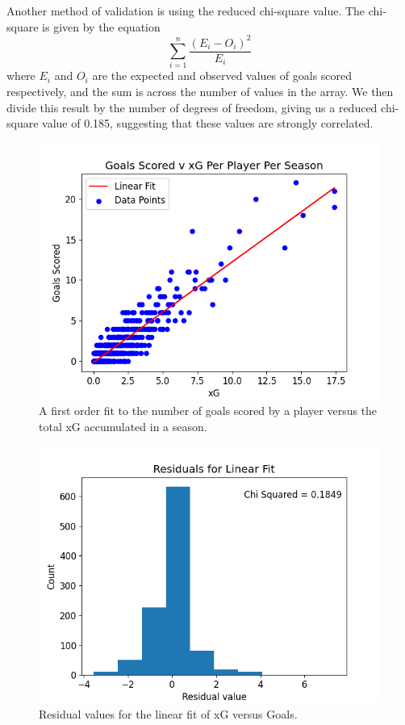 \documentclass[12pt, a4paper, twocolumn]{article}
\begin{document}
Another method of validation is using the reduced chi-square value. The chi-square is given by the equation
\begin{equation}
\sum_{i=1}^n \frac{(E_i - O_i)^2}{E_i} 
\end{equation}
where $E_i$ and $O_i$ are the expected and observed values of goals scored respectively, and the sum is across the number of values in the array. We then divide this result by the number of degrees of freedom, giving us a reduced chi-square value of 0.185, suggesting that these values are strongly correlated.

\begin{figure}
  \includegraphics[width=\linewidth]{../vis/playerStats/goals_v_xg_linear_fit.png}
  \caption{A first order fit to the number of goals scored by a player versus the total xG accumulated in a season.}
  \label{xg_line}
\end{figure}

\begin{figure}
  \includegraphics[width=\linewidth]{../vis/playerStats/goals_v_xg_residuals.png}
  \caption{Residual values for the linear fit of xG versus Goals.}
  \label{res}
\end{figure}
\end{document}
